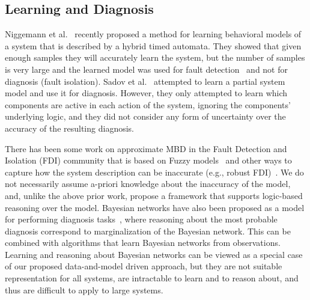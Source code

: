 \documentclass[12pt]{article}
\newcommand{\note}[1]{\textbf{\textit{#1}}}
\begin{document}
\subsection{Learning and Diagnosis}
Niggemann et al.~\cite{niggemann2012learning} recently proposed a method for learning behavioral models of a system that is described by a hybrid timed automata. They showed that given enough samples they will accurately learn the system, but the number of samples is very large 
and the learned model was used for fault detection~\cite{niggemann2012learning} and not for diagnosis (fault isolation). Sadov et al.~\cite{sadov2010towards} attempted to learn a partial system model and use it for diagnosis. However, they only attempted to learn which components are active in each action of the system, ignoring the components' underlying logic, and they did not consider any form of uncertainty over the  accuracy of the resulting diagnosis. 

There has been some work on approximate MBD in the Fault Detection and Isolation (FDI) community that is based on Fuzzy models~\cite{dexter1997model,mendoncca2003fault,castillo2005model,mendoncca2009architecture} and other ways to capture how the system description can be inaccurate (e.g., robust FDI)~\cite{chen2012robust,frank1997survey}. 
We do not necessarily assume a-priori knowledge about the inaccuracy of the model, and, unlike the above prior work, propose a framework that supports logic-based reasoning over the model.
Bayesian networks have also been proposed as a model for performing diagnosis tasks~\cite{darwiche2009modeling,el1995diagnosing}, where reasoning about the most probable diagnosis correspond to marginalization of the Bayesian network. This can be combined with algorithms that learn Bayesian networks from observations. Learning and reasoning about Bayesian networks can be viewed as a special case of our proposed data-and-model driven approach, but they are not suitable representation for all systems, are intractable  to learn and to reason about, and thus are difficult to  apply to large systems. 

\end{document}

